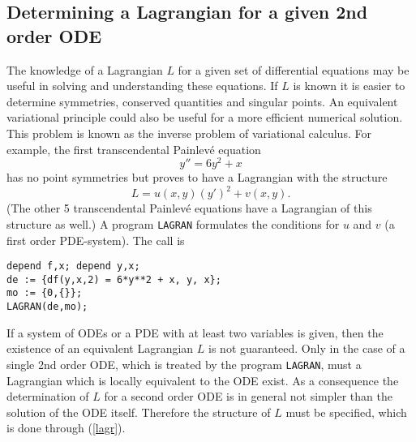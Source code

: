 \subsection{Determining a Lagrangian for a given 2nd order ODE}
The knowledge of a Lagrangian $L$ for a given set of differential
equations may be useful in solving and understanding these equations.
If $L$ is known it is easier to determine symmetries, conserved
quantities and singular points. An equivalent variational principle
could also be useful for a more efficient numerical solution.
This problem is known as the inverse problem of variational calculus.
For example, the first transcendental Painlev\'{e} equation
\begin{equation}
 y'' = 6y^2 + x        \label{pain}
\end{equation}
has no point symmetries but proves to have a Lagrangian with the
structure
\begin{equation}
 L = u(x,y)(y')^2 + v(x,y).   \label{lagr}
\end{equation}
(The other 5 transcendental Painlev\'{e} equations have a Lagrangian
of this structure as well.)
A program {\tt LAGRAN} formulates the conditions for $u$ and $v$ (a first
order PDE-system). The call is
\begin{verbatim}
depend f,x; depend y,x;
de := {df(y,x,2) = 6*y**2 + x, y, x};
mo := {0,{}};
LAGRAN(de,mo);
\end{verbatim}

If a system of ODEs or a PDE with at least two variables is given,
then the existence of an equivalent Lagrangian $L$ is not guaranteed.
Only in the case of
a single 2nd order ODE, which is treated by the program {\tt LAGRAN},
must a Lagrangian which is locally equivalent to the ODE
exist. As a consequence the determination of $L$ for a second order
ODE is in general not simpler than the solution of the ODE itself.
Therefore the structure of
$L$ must be specified, which is done through (\ref{lagr}).

